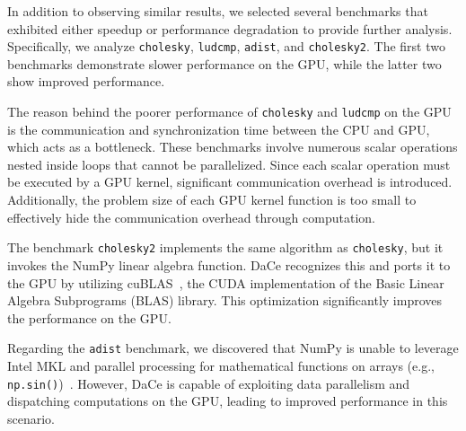 In addition to observing similar results, we selected several benchmarks that exhibited either speedup or performance degradation to provide further analysis. Specifically, we analyze \texttt{cholesky}, \texttt{ludcmp}, \texttt{adist}, and \texttt{cholesky2}. The first two benchmarks demonstrate slower performance on the GPU, while the latter two show improved performance.

The reason behind the poorer performance of \texttt{cholesky} and \texttt{ludcmp} on the GPU is the communication and synchronization time between the CPU and GPU, which acts as a bottleneck. These benchmarks involve numerous scalar operations nested inside loops that cannot be parallelized. Since each scalar operation must be executed by a GPU kernel, significant communication overhead is introduced. Additionally, the problem size of each GPU kernel function is too small to effectively hide the communication overhead through computation.

The benchmark \texttt{cholesky2} implements the same algorithm as \texttt{cholesky}, but it invokes the NumPy linear algebra function. DaCe recognizes this and ports it to the GPU by utilizing cuBLAS~\cite{cublas}, the CUDA implementation of the Basic Linear Algebra Subprograms (BLAS) library. This optimization significantly improves the performance on the GPU.

Regarding the \texttt{adist} benchmark, we discovered that NumPy is unable to leverage Intel MKL and parallel processing for mathematical functions on arrays (e.g., \texttt{np.sin()})~\cite{numpy_pp}. However, DaCe is capable of exploiting data parallelism and dispatching computations on the GPU, leading to improved performance in this scenario.